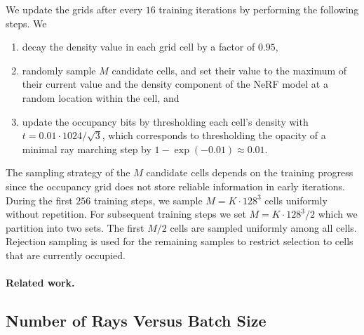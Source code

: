 \documentclass[acmtog,authorversion]{acmart}
\begin{document}
We update the grids after every $16$ training iterations by performing the following steps. We
\begin{enumerate}[leftmargin=*]
  \item decay the density value in each grid cell by a factor of $0.95$,
  \item randomly sample $M$ candidate cells, and set their value to the maximum of their current value and the density component of the NeRF model at a random location within the cell, and
  \item update the occupancy bits by thresholding each cell's density with ${t = 0.01 \cdot 1024/\sqrt{3}}$, which corresponds to thresholding the opacity of a minimal ray marching step by ${1 - \exp(-0.01) \approx 0.01}$.
\end{enumerate}
The sampling strategy of the $M$ candidate cells depends on the training progress since the occupancy grid does not store reliable information in early iterations.
During the first $256$ training steps, we sample ${M = K \cdot 128^3}$ cells uniformly without repetition.
For subsequent training steps we set ${M = K \cdot 128^3 / 2}$ which we partition into two sets. The first ${M/2}$ cells are sampled uniformly among all cells. Rejection sampling is used for the remaining samples to restrict selection to cells that are currently occupied. 

\paragraph{Related work.}


\subsection{Number of Rays Versus Batch Size}\label{app:nerf-batch-size}
\end{document}
